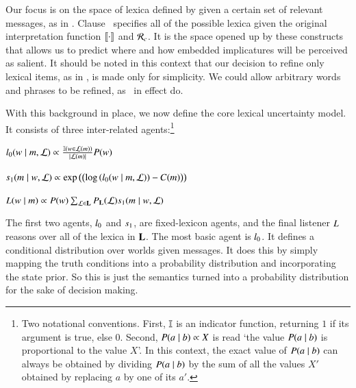\documentclass[leqno,12pt]{article}
\begin{document}
Our focus is on the space of lexica defined by
 given a certain set of relevant messages,
as in . Clause~
specifies all of the possible lexica given the original interpretation
function $\llbracket\cdot\rrbracket$ and $\mathcal{R}_{c}$. It is the space opened up by
these constructs that allows us to predict where and how embedded
implicatures will be perceived as salient. It should be noted in this
context that our decision to refine only lexical items, as in
, is made only for simplicity. We could
allow arbitrary words and phrases to be refined, as \CFS\ in effect
do.

With this background in place, we now define the core lexical
uncertainty model. It consists of three inter-related
agents:\footnote{Two notational conventions. First, $\mathbb{I}$ is an
  indicator function, returning $1$ if its argument is true, else
  $0$. Second, $P(a \mid b) \propto X$ is read `the value $P(a
  \mid b)$ is proportional to the value $X$'. In this context, the
  exact value of $P(a \mid b)$ can always be obtained by dividing
  $P(a \mid b)$ by the sum of all the values $X'$ obtained by
  replacing $a$ by one of its $a'$.}
%
\begin{examples}
\item\label{agents}
  \begin{examples}
  \item\label{l0}%
    $l_{0}(w \mid m, \mathcal{L}) \propto
    \frac{\mathbb{I}(w \in \mathcal{L}(m))}{|\mathcal{L}(m)|}
    P(w)$

  \item\label{s1}%
    $s_{1}(m \mid w, \mathcal{L}) \propto
    \exp
    \left(
      \left(
        \log\left(l_{0}(w \mid m, \mathcal{L}) \right)
        - 
        C(m)
      \right)
    \right)$
    
  \item\label{L} 
    $L(w \mid m) 
    \propto 
    P(w)
    \sum_{\mathcal{L} \in \mathbf{L}}
    P_{\mathbf{L}}(\mathcal{L})
    s_{1}(m \mid w, \mathcal{L})$
  \end{examples}
\end{examples}

The first two agents, $l_{0}$ and $s_{1}$, are
fixed-lexicon agents, and the final listener $L$
reasons over all of the lexica in $\mathbf{L}$.  The most basic agent is
$l_{0}$. It defines a conditional distribution over worlds
given messages. It does this by simply mapping the truth conditions
into a probability distribution and incorporating the state prior. So
this is just the semantics turned into a probability distribution for
the sake of decision making.
\end{document}
